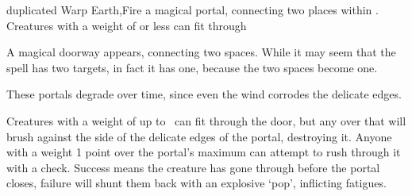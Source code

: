   {duplicated}%
  {Warp}%
  {Earth,Fire}%
  {}%
  {a magical portal, connecting two places within \spellRange. Creatures with a \gls{weight} of  or less can fit through}%
  {
    A magical doorway appears, connecting two spaces.
    While it may seem that the spell has two targets, in fact it has one, because the two spaces become one.

    These portals degrade over time, since even the wind corrodes the delicate edges.

    Creatures with a \gls{weight} of up to \spellArea\ can fit through the door, but any over that will brush against the side of the delicate edges of the portal, destroying it.
    Anyone with a \gls{weight} 1 point over the portal's maximum can attempt to rush through it with a  check.
    Success means the creature has gone through before the portal closes, failure will shunt them back with an explosive `pop', inflicting  \glspl{fatigue}.
  }

